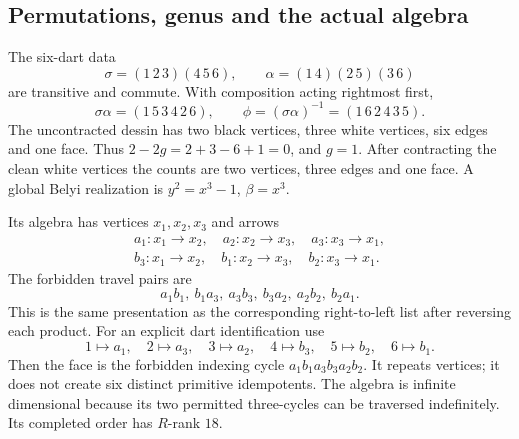 \documentclass[11pt,oneside,openany]{book}
\theoremstyle{definition}\newtheorem{definition}[theorem]{Definition}
\theoremstyle{remark}\newtheorem{remark}[theorem]{Remark}
\begin{document}
\subsection{Permutations, genus and the actual algebra}
The six-dart data
\[
 \sigma=(1\,2\,3)(4\,5\,6),\qquad
 \alpha=(1\,4)(2\,5)(3\,6)
\]
are transitive and commute. With composition acting rightmost first,
\[
 \sigma\alpha=(1\,5\,3\,4\,2\,6),\qquad
 \phi=(\sigma\alpha)^{-1}=(1\,6\,2\,4\,3\,5).
\]
The uncontracted dessin has two black vertices, three white vertices, six edges
and one face. Thus $2-2g=2+3-6+1=0$, and $g=1$. After contracting the clean
white vertices the counts are two vertices, three edges and one face. A global
Belyi realization is $y^2=x^3-1$, $\beta=x^3$.

Its algebra has vertices $x_1,x_2,x_3$ and arrows
\[
 \begin{gathered}
 a_1:x_1\to x_2,\quad a_2:x_2\to x_3,\quad a_3:x_3\to x_1,\\
 b_3:x_1\to x_2,\quad b_1:x_2\to x_3,\quad b_2:x_3\to x_1.
\end{gathered}
\]
The forbidden travel pairs are
\[
 a_1b_1,\ b_1a_3,\ a_3b_3,\ b_3a_2,\ a_2b_2,\ b_2a_1.
\]
This is the same presentation as the corresponding right-to-left list after
reversing each product. For an explicit dart identification use
\[
 1\mapsto a_1,\quad2\mapsto a_3,\quad3\mapsto a_2,
 \quad4\mapsto b_3,\quad5\mapsto b_2,\quad6\mapsto b_1.
\]
Then the face is the forbidden indexing cycle
$a_1b_1a_3b_3a_2b_2$. It repeats vertices; it does not create six distinct
primitive idempotents. The algebra is infinite dimensional because its two
permitted three-cycles can be traversed indefinitely. Its completed order has
$R$-rank $18$.
\end{document}
